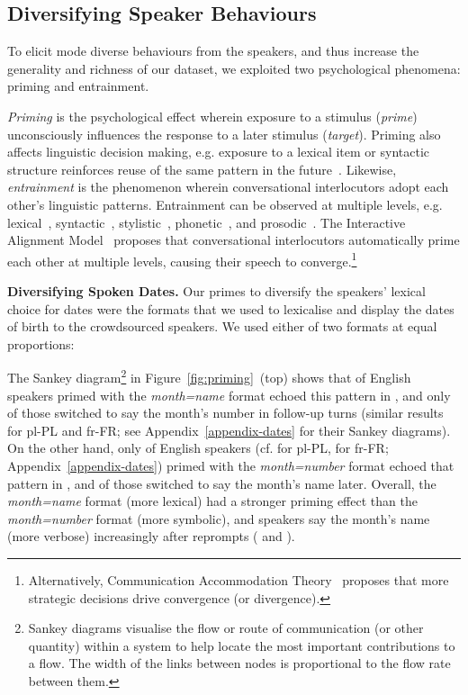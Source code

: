 \documentclass[11pt]{article}
\newcommand{\rparagraph}[1]{\vspace{1.4mm}\noindent\textbf{#1.}}
\begin{document}
{\subsection{{Diversifying Speaker Behaviours}}\label{sec:data-analysis}

{
To elicit mode diverse behaviours from the speakers,
and thus increase the generality and richness of our dataset,
we exploited two psychological phenomena: priming and entrainment.
}

\textit{Priming} is the psychological effect wherein exposure to a stimulus (\textit{prime})
unconsciously influences the response to a later stimulus (\textit{target}).
Priming also affects linguistic decision making,
e.g.
exposure to a lexical item or syntactic structure
reinforces reuse of the same pattern in the future~\cite{reitter2006computational,reitter2010priming}.
Likewise,
\textit{entrainment} is the phenomenon wherein
conversational interlocutors adopt each other's linguistic patterns.
Entrainment can be observed at multiple levels,
e.g.
lexical~\cite{brennan1996conceptual},
syntactic~\cite{reitter2007predicting},
stylistic~\cite{niederhoffer2002linguistic},
phonetic~\cite{pardo2006phonetic},
and prosodic~\cite{coulston2002amplitude}.
The Interactive Alignment Model~\cite{pickering2004toward}
proposes that conversational interlocutors automatically prime each other at multiple levels, causing their speech to converge.\footnote{Alternatively, Communication Accommodation Theory~\cite{giles19911}
proposes that more strategic decisions drive convergence (or divergence).}

\rparagraph{Diversifying Spoken Dates} Our primes
to diversify the speakers' lexical choice for dates
were the formats that we used
to lexicalise and display the dates of birth
to the crowdsourced speakers.
We used either of two formats at equal proportions:


\vspace{-0.5mm}
{\small
}
The Sankey diagram\footnote{Sankey diagrams
    visualise the flow or route of communication (or other quantity) within a system to help locate the most important contributions to a flow. The width of the links between nodes 
    is proportional to the flow rate between them.} in Figure~\ref{fig:priming}~(top)
shows that  of English speakers primed with the \textit{month=name} format
echoed this pattern in , and only  of those switched to say the month's number in follow-up turns (similar results for pl-PL and fr-FR; see Appendix~\ref{appendix-dates} for their Sankey diagrams).
On the other hand, only  of English speakers (cf.  for pl-PL,  for fr-FR; Appendix~\ref{appendix-dates}) primed with the \textit{month=number} format
echoed that pattern in ,
and  of those switched to say the month's name later.
Overall, the \textit{month=name} format (more lexical) had a stronger priming effect than the \textit{month=number} format (more symbolic),
and speakers say the month's name (more verbose) increasingly after reprompts ( and ).

}
\end{document}
